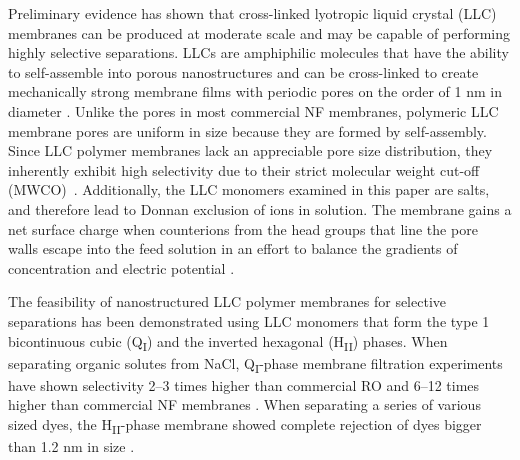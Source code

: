 \documentclass[journal=jpcbfk,manuscript=article]{achemso}
\begin{document}
  Preliminary evidence has shown that cross-linked lyotropic liquid crystal
  (LLC) membranes can be produced at moderate scale and may be capable of
  performing highly selective separations. LLCs are amphiphilic molecules that
  have the ability to self-assemble into porous nanostructures
  \cite{smith_ordered_1997} and can be cross-linked to create mechanically strong
  membrane films with periodic pores on the order of 1 nm in diameter
  \cite{zhou_supported_2005}. Unlike the pores in most commercial NF membranes,
  polymeric LLC membrane pores are uniform in size because they are formed by
  self-assembly. Since LLC polymer membranes lack an appreciable pore size
  distribution, they inherently exhibit high selectivity due to their strict
  molecular weight cut-off (MWCO)~\cite{zhou_supported_2005}. Additionally, the
  LLC monomers examined in this paper are salts, and therefore lead to Donnan
  exclusion of ions in solution. The membrane gains a net surface charge when
  counterions from the head groups that line the pore walls escape into the feed
  solution in an effort to balance the gradients of concentration and electric
  potential \cite{donnan_theory_1995}.    

  The feasibility of nanostructured LLC polymer membranes for selective
  separations has been demonstrated using LLC monomers that form the type 1
  bicontinuous cubic (Q\textsubscript{I})
  \cite{hatakeyama_water_2011,hatakeyama_nanoporous_2010,carter_glycerol-based_2012}
  and the inverted hexagonal (H\textsubscript{II}) \cite{zhou_supported_2005}
  phases. When separating organic solutes from NaCl, Q\textsubscript{I}-phase
  membrane filtration experiments have shown selectivity 2--3 times higher than
  commercial RO and 6--12 times higher than commercial NF membranes
  \cite{dischinger_application_2017}. When separating a series of various sized
  dyes, the H\textsubscript{II}-phase membrane showed complete rejection of dyes
  bigger than 1.2 nm in size \cite{zhou_supported_2005}. 
\end{document}
